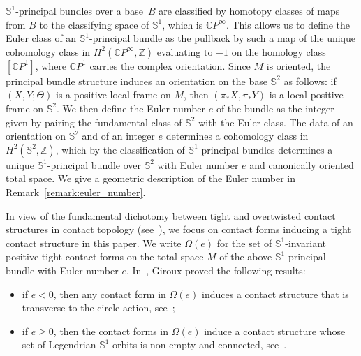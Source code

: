 \documentclass[AHL,Unicode,longabstracts]{cedram}
\newcommand{\bbS}{\mathbb{S}}
\newcommand{\bbZ}{\mathbb{Z}}
\newcommand{\bbC}{\mathbb{C}}
\newcommand{\bbS}{\mathbb{S}}
\begin{document}
$\bbS^1$-principal bundles over a base~$B$ are classified by homotopy classes of maps from $B$ to the classifying space of $\bbS^1$, which is $\bbC P^\infty$. This allows us to define the Euler class of an $\bbS^1$-principal bundle as the pullback by such a map of the unique cohomology class in $H^2(\bbC P^\infty, \bbZ)$ evaluating to $-1$ on the homology class $[\bbC P^1]$, where $\bbC P^1$ carries the complex orientation. Since $M$ is oriented, the principal bundle structure induces an orientation on the base $\bbS^2$ as follows: if $(X,Y; \Theta)$ is a positive local frame on $M$, then $(\pi_* X,\pi_* Y)$ is a local positive frame on $\bbS^2$. We then define the Euler number $e$ of the bundle as the integer given by pairing the fundamental class of $\bbS^2$ with the Euler class. The data of an orientation on $\bbS^2$ and of an integer $e$ determines a cohomology class in $H^2(\bbS^2, \bbZ)$, which by the classification of $\bbS^1$-principal bundles determines a unique $\bbS^1$-principal bundle over $\bbS^2$ with Euler number $e$ and canonically oriented total space. We give a geometric description of the Euler number in Remark~\ref{remark:euler_number}.

In view of the fundamental dichotomy between tight and overtwisted contact structures in contact topology (see~\cite{geiges_2008}), we focus on contact forms inducing a tight contact structure in this paper. We write $\Omega(e)$ for the set of $\bbS^1$-invariant positive tight contact forms on the total space $M$ of the above $\bbS^1$-principal bundle with Euler number $e$. In~\cite{Giroux1999StructuresDC}, Giroux proved the following results:
\begin{itemize}
\item if $e < 0$, then any contact form in $\Omega(e)$ induces a contact structure that is transverse to the circle action, see~\cite[Theorem~1.1]{Giroux1999StructuresDC};
\item if $e \geq 0$, then the contact forms in $\Omega(e)$ induce a contact structure whose set of Legendrian $\bbS^1$-orbits is non-empty and connected, see~\cite[Proposition~4.1.a]{Giroux1999StructuresDC}.
\end{itemize}
\end{document}
